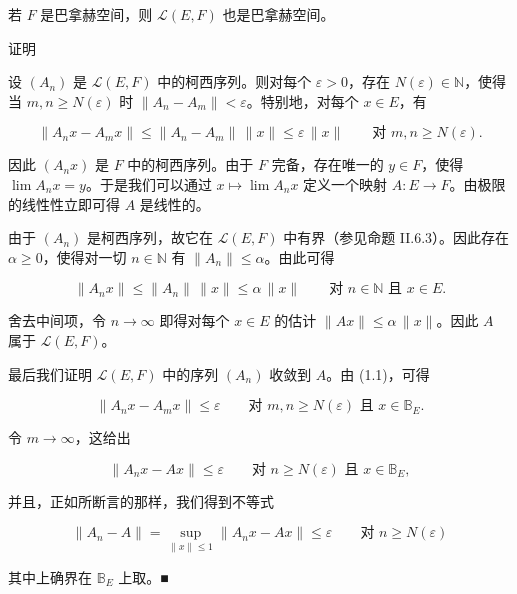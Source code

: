 \begin{theorem}

若 $ F $ 是巴拿赫空间，则 $ \mathcal{L}(E, F) $ 也是巴拿赫空间。

证明

\begin{subitems}
\item

设 $ (A_{n}) $ 是 $ \mathcal{L}(E, F) $ 中的柯西序列。则对每个 $ \varepsilon > 0 $，存在 $ N(\varepsilon) \in \mathbb{N} $，使得当 $ m, n \ge N(\varepsilon) $ 时 $ \|A_{n} - A_{m}\| < \varepsilon $。特别地，对每个 $ x \in E $，有

\begin{equation}
\|A_{n}x - A_{m}x\| \le \|A_{n} - A_{m}\|\,\|x\| \le \varepsilon\,\|x\| \qquad \text{对 } m, n \ge N(\varepsilon) .\tag{1.1}
\end{equation}

因此 $ (A_{n}x) $ 是 $ F $ 中的柯西序列。由于 $ F $ 完备，存在唯一的 $ y \in F $，使得 $ \lim A_{n}x = y $。于是我们可以通过 $ x \mapsto \lim A_{n}x $ 定义一个映射 $ A : E \to F $。由极限的线性性立即可得 $ A $ 是线性的。

\item

由于 $ (A_{n}) $ 是柯西序列，故它在 $ \mathcal{L}(E, F) $ 中有界（参见命题 II.6.3）。因此存在 $ \alpha \ge 0 $，使得对一切 $ n \in \mathbb{N} $ 有 $ \|A_{n}\| \le \alpha $。由此可得

\[
\|A_{n}x\| \le \|A_{n}\|\,\|x\| \le \alpha\,\|x\| \qquad \text{对 } n \in \mathbb{N} \text{ 且 } x \in E .
\]

舍去中间项，令 $ n \to \infty $ 即得对每个 $ x \in E $ 的估计 $ \|Ax\| \le \alpha\,\|x\| $。因此 $ A $ 属于 $ \mathcal{L}(E, F) $。

\item

最后我们证明 $ \mathcal{L}(E, F) $ 中的序列 $ (A_{n}) $ 收敛到 $ A $。由 (1.1)，可得

\[
\|A_{n}x - A_{m}x\| \le \varepsilon \qquad \text{对 } m, n \ge N(\varepsilon) \text{ 且 } x \in \mathbb{B}_{E} .
\]

令 $ m \to \infty $，这给出

\[
\|A_{n}x - Ax\| \le \varepsilon \qquad \text{对 } n \ge N(\varepsilon) \text{ 且 } x \in \mathbb{B}_{E} ,
\]

并且，正如所断言的那样，我们得到不等式

\[
\|A_{n} - A\| = \sup_{\|x\| \le 1}\|A_{n}x - Ax\| \le \varepsilon \qquad \text{对 } n \ge N(\varepsilon)
\]

其中上确界在 $ \mathbb{B}_{E} $ 上取。\nobreak\hspace{0.35em}■

\end{subitems}

\end{theorem}

